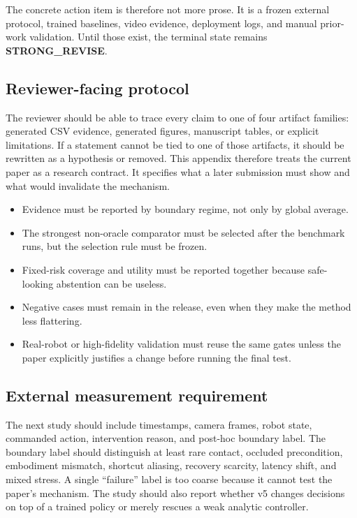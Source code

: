 \documentclass{article}
\begin{document}
The concrete action item is therefore not more prose. It is a frozen external protocol, trained baselines, video evidence, deployment logs, and manual prior-work validation. Until those exist, the terminal state remains \textbf{STRONG\_REVISE}.

\subsection{Reviewer-facing protocol}
The reviewer should be able to trace every claim to one of four artifact families: generated CSV evidence, generated figures, manuscript tables, or explicit limitations. If a statement cannot be tied to one of those artifacts, it should be rewritten as a hypothesis or removed. This appendix therefore treats the current paper as a research contract. It specifies what a later submission must show and what would invalidate the mechanism.

\begin{itemize}
\item Evidence must be reported by boundary regime, not only by global average.
\item The strongest non-oracle comparator must be selected after the benchmark runs, but the selection rule must be frozen.
\item Fixed-risk coverage and utility must be reported together because safe-looking abstention can be useless.
\item Negative cases must remain in the release, even when they make the method less flattering.
\item Real-robot or high-fidelity validation must reuse the same gates unless the paper explicitly justifies a change before running the final test.
\end{itemize}

\subsection{External measurement requirement}
The next study should include timestamps, camera frames, robot state, commanded action, intervention reason, and post-hoc boundary label. The boundary label should distinguish at least rare contact, occluded precondition, embodiment mismatch, shortcut aliasing, recovery scarcity, latency shift, and mixed stress. A single ``failure'' label is too coarse because it cannot test the paper's mechanism. The study should also report whether v5 changes decisions on top of a trained policy or merely rescues a weak analytic controller.
\end{document}
